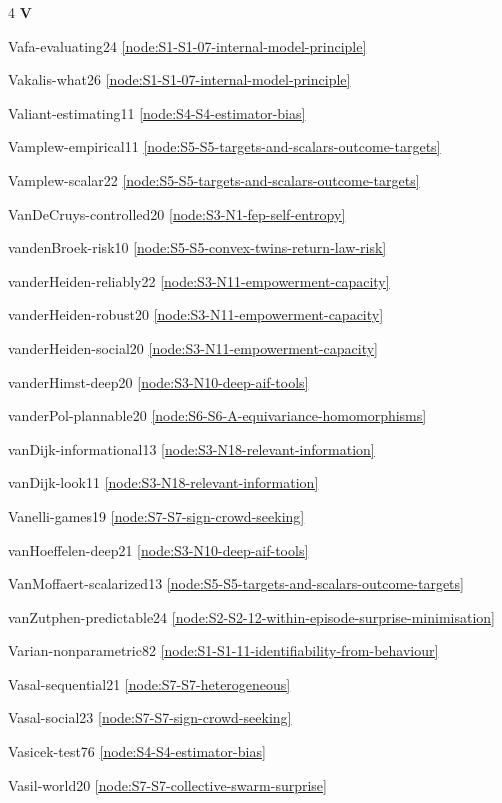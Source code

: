 \documentclass[10pt]{article}
\begin{document}
{\begin{multicols}{4}
\smallskip\textbf{V}\par
Vafa-evaluating24 \hfill \ref{node:S1-S1-07-internal-model-principle}\par
Vakalis-what26 \hfill \ref{node:S1-S1-07-internal-model-principle}\par
Valiant-estimating11 \hfill \ref{node:S4-S4-estimator-bias}\par
Vamplew-empirical11 \hfill \ref{node:S5-S5-targets-and-scalars-outcome-targets}\par
Vamplew-scalar22 \hfill \ref{node:S5-S5-targets-and-scalars-outcome-targets}\par
VanDeCruys-controlled20 \hfill \ref{node:S3-N1-fep-self-entropy}\par
vandenBroek-risk10 \hfill \ref{node:S5-S5-convex-twins-return-law-risk}\par
vanderHeiden-reliably22 \hfill \ref{node:S3-N11-empowerment-capacity}\par
vanderHeiden-robust20 \hfill \ref{node:S3-N11-empowerment-capacity}\par
vanderHeiden-social20 \hfill \ref{node:S3-N11-empowerment-capacity}\par
vanderHimst-deep20 \hfill \ref{node:S3-N10-deep-aif-tools}\par
vanderPol-plannable20 \hfill \ref{node:S6-S6-A-equivariance-homomorphisms}\par
vanDijk-informational13 \hfill \ref{node:S3-N18-relevant-information}\par
vanDijk-look11 \hfill \ref{node:S3-N18-relevant-information}\par
Vanelli-games19 \hfill \ref{node:S7-S7-sign-crowd-seeking}\par
vanHoeffelen-deep21 \hfill \ref{node:S3-N10-deep-aif-tools}\par
VanMoffaert-scalarized13 \hfill \ref{node:S5-S5-targets-and-scalars-outcome-targets}\par
vanZutphen-predictable24 \hfill \ref{node:S2-S2-12-within-episode-surprise-minimisation}\par
Varian-nonparametric82 \hfill \ref{node:S1-S1-11-identifiability-from-behaviour}\par
Vasal-sequential21 \hfill \ref{node:S7-S7-heterogeneous}\par
Vasal-social23 \hfill \ref{node:S7-S7-sign-crowd-seeking}\par
Vasicek-test76 \hfill \ref{node:S4-S4-estimator-bias}\par
Vasil-world20 \hfill \ref{node:S7-S7-collective-swarm-surprise}\par

\end{multicols}}
\end{document}
